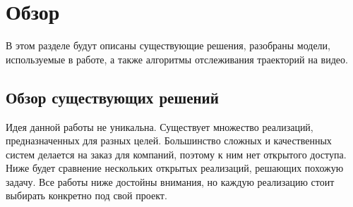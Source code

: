 
\section{Обзор}
\label{sec:related}



В этом разделе будут описаны существующие решения, разобраны модели, используемые в работе,
а также алгоритмы отслеживания траекторий на видео.

\subsection{Обзор существующих решений}

Идея данной работы не уникальна. Существует множество реализаций, предназначенных для разных целей.
Большинство сложных и качественных систем делается на заказ для компаний,
поэтому к ним нет открытого доступа.
Ниже будет сравнение нескольких открытых реализаций, решающих похожую задачу.
Все работы ниже достойны внимания, но каждую реализацию стоит выбирать конкретно под свой проект.

